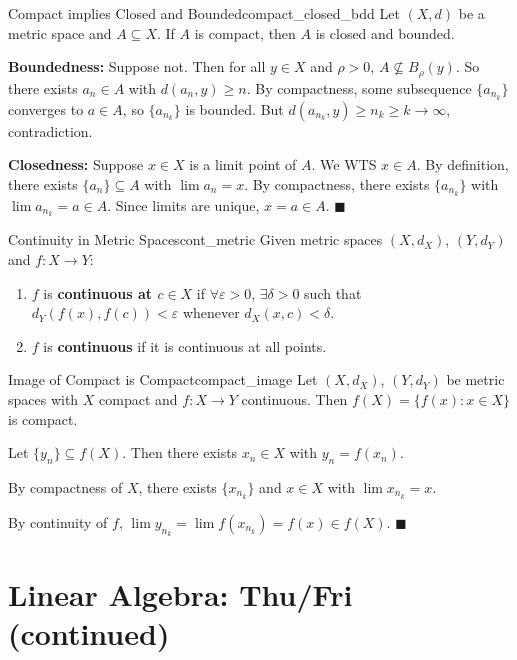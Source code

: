\documentclass[11pt, letterpaper, openany]{book}
\renewenvironment{proof}[1][\proofname]{%
  \tcolorbox[blanker, breakable, left=1em,
    before skip=1em, after skip=1em,
    borderline west={2pt}{0pt}{MagicTeal!50},
    colback=MagicCream,
    before upper={\textcolor{MagicTeal}{\sffamily\bfseries #1.}\space}
  ]%
}{%
  \hfill\textcolor{MagicTeal}{\ensuremath{\blacksquare}}\endtcolorbox%
}
\begin{document}
\begin{thm}{Compact implies Closed and Bounded}{compact_closed_bdd}
Let $(X, d)$ be a metric space and $A \subseteq X$. If $A$ is compact, then $A$ is closed and bounded.
\end{thm}

\begin{proof}
\textbf{Boundedness:} Suppose not. Then for all $y \in X$ and $\rho > 0$, $A \not\subseteq B_\rho(y)$. So there exists $a_n \in A$ with $d(a_n, y) \geq n$. By compactness, some subsequence $\{a_{n_k}\}$ converges to $a \in A$, so $\{a_{n_k}\}$ is bounded. But $d(a_{n_k}, y) \geq n_k \geq k \to \infty$, contradiction.

\textbf{Closedness:} Suppose $x \in X$ is a limit point of $A$. We WTS $x \in A$. By definition, there exists $\{a_n\} \subseteq A$ with $\lim a_n = x$. By compactness, there exists $\{a_{n_k}\}$ with $\lim a_{n_k} = a \in A$. Since limits are unique, $x = a \in A$.
\end{proof}

\begin{defn}{Continuity in Metric Spaces}{cont_metric}
Given metric spaces $(X, d_X)$, $(Y, d_Y)$ and $f: X \to Y$:
\begin{enumerate}
    \item $f$ is \textbf{continuous at $c \in X$} if $\forall \varepsilon > 0$, $\exists \delta > 0$ such that $d_Y(f(x), f(c)) < \varepsilon$ whenever $d_X(x, c) < \delta$.
    \item $f$ is \textbf{continuous} if it is continuous at all points.
\end{enumerate}
\end{defn}

\begin{thm}{Image of Compact is Compact}{compact_image}
Let $(X, d_X)$, $(Y, d_Y)$ be metric spaces with $X$ compact and $f: X \to Y$ continuous. Then $f(X) = \{f(x) : x \in X\}$ is compact.
\end{thm}

\begin{proof}
Let $\{y_n\} \subseteq f(X)$. Then there exists $x_n \in X$ with $y_n = f(x_n)$.

By compactness of $X$, there exists $\{x_{n_k}\}$ and $x \in X$ with $\lim x_{n_k} = x$.

By continuity of $f$, $\lim y_{n_k} = \lim f(x_{n_k}) = f(x) \in f(X)$.
\end{proof}

\section{Linear Algebra: Thu/Fri (continued)}
\end{document}

